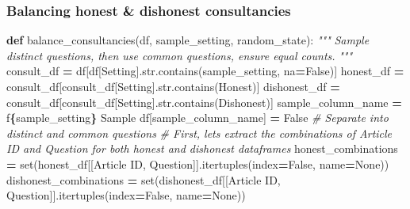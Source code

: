 \documentclass[
]{article}
\newenvironment{Shaded}{\begin{snugshade}}{\end{snugshade}}
\newcommand{\BuiltInTok}[1]{#1}
\newcommand{\CommentTok}[1]{\textcolor[rgb]{0.56,0.35,0.01}{\textit{#1}}}
\newcommand{\KeywordTok}[1]{\textcolor[rgb]{0.13,0.29,0.53}{\textbf{#1}}}
\newcommand{\NormalTok}[1]{#1}
\newcommand{\OperatorTok}[1]{\textcolor[rgb]{0.81,0.36,0.00}{\textbf{#1}}}
\newcommand{\SpecialCharTok}[1]{\textcolor[rgb]{0.81,0.36,0.00}{\textbf{#1}}}
\newcommand{\SpecialStringTok}[1]{\textcolor[rgb]{0.31,0.60,0.02}{#1}}
\newcommand{\StringTok}[1]{\textcolor[rgb]{0.31,0.60,0.02}{#1}}
\newcommand{\VariableTok}[1]{\textcolor[rgb]{0.00,0.00,0.00}{#1}}
\begin{document}
\subsubsection{Balancing honest \& dishonest
consultancies}\label{balancing-honest-dishonest-consultancies}

\begin{Shaded}
\begin{Highlighting}[]
\KeywordTok{def}\NormalTok{ balance\_consultancies(df, sample\_setting, random\_state):}
    \CommentTok{"""}
\CommentTok{    Sample distinct questions, then use common questions, ensure equal counts.}
\CommentTok{    """}
\NormalTok{    consult\_df }\OperatorTok{=}\NormalTok{ df[df[}\StringTok{\textquotesingle{}Setting\textquotesingle{}}\NormalTok{].}\BuiltInTok{str}\NormalTok{.contains(sample\_setting, na}\OperatorTok{=}\VariableTok{False}\NormalTok{)]}
\NormalTok{    honest\_df }\OperatorTok{=}\NormalTok{ consult\_df[consult\_df[}\StringTok{\textquotesingle{}Setting\textquotesingle{}}\NormalTok{].}\BuiltInTok{str}\NormalTok{.contains(}\StringTok{\textquotesingle{}Honest\textquotesingle{}}\NormalTok{)]}
\NormalTok{    dishonest\_df }\OperatorTok{=}\NormalTok{ consult\_df[consult\_df[}\StringTok{\textquotesingle{}Setting\textquotesingle{}}\NormalTok{].}\BuiltInTok{str}\NormalTok{.contains(}\StringTok{\textquotesingle{}Dishonest\textquotesingle{}}\NormalTok{)]}
\NormalTok{    sample\_column\_name }\OperatorTok{=} \SpecialStringTok{f\textquotesingle{}}\SpecialCharTok{\{}\NormalTok{sample\_setting}\SpecialCharTok{\}}\SpecialStringTok{ Sample\textquotesingle{}}
\NormalTok{    df[sample\_column\_name] }\OperatorTok{=} \VariableTok{False}
    \CommentTok{\# Separate into distinct and common questions}
    \CommentTok{\# First, let\textquotesingle{}s extract the combinations of \textquotesingle{}Article ID\textquotesingle{} and \textquotesingle{}Question\textquotesingle{} for both honest and dishonest dataframes}
\NormalTok{    honest\_combinations }\OperatorTok{=} \BuiltInTok{set}\NormalTok{(honest\_df[[}\StringTok{\textquotesingle{}Article ID\textquotesingle{}}\NormalTok{, }\StringTok{\textquotesingle{}Question\textquotesingle{}}\NormalTok{]].itertuples(index}\OperatorTok{=}\VariableTok{False}\NormalTok{, name}\OperatorTok{=}\VariableTok{None}\NormalTok{))}
\NormalTok{    dishonest\_combinations }\OperatorTok{=} \BuiltInTok{set}\NormalTok{(dishonest\_df[[}\StringTok{\textquotesingle{}Article ID\textquotesingle{}}\NormalTok{, }\StringTok{\textquotesingle{}Question\textquotesingle{}}\NormalTok{]].itertuples(index}\OperatorTok{=}\VariableTok{False}\NormalTok{, name}\OperatorTok{=}\VariableTok{None}\NormalTok{))}

\end{Highlighting}
\end{Shaded}
\end{document}
